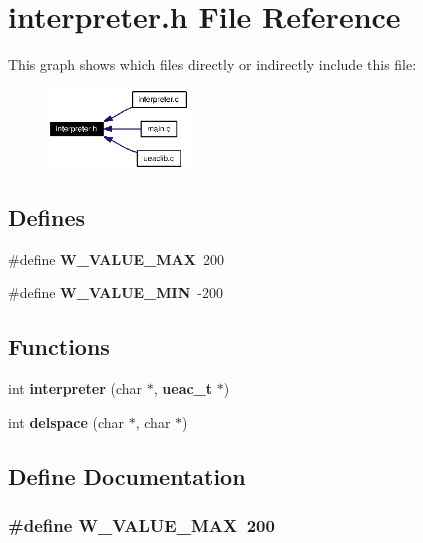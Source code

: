 \section{interpreter.h File Reference}
\label{interpreter_8h}


This graph shows which files directly or indirectly include this file:\begin{figure}[H]
\begin{center}
\leavevmode
\includegraphics[width=106pt]{interpreter_8h__dep__incl}
\end{center}
\end{figure}
\subsection*{Defines}
\begin{CompactItemize}
\item 
\#define {\bf W\_\-VALUE\_\-MAX}~200
\item 
\#define {\bf W\_\-VALUE\_\-MIN}~-200
\end{CompactItemize}
\subsection*{Functions}
\begin{CompactItemize}
\item 
int {\bf interpreter} (char $\ast$, {\bf ueac\_\-t} $\ast$)
\item 
int {\bf delspace} (char $\ast$, char $\ast$)
\end{CompactItemize}


\subsection{Define Documentation}
\subsubsection{\setlength{\rightskip}{0pt plus 5cm}\#define W\_\-VALUE\_\-MAX~200}\label{interpreter_8h_a0}




